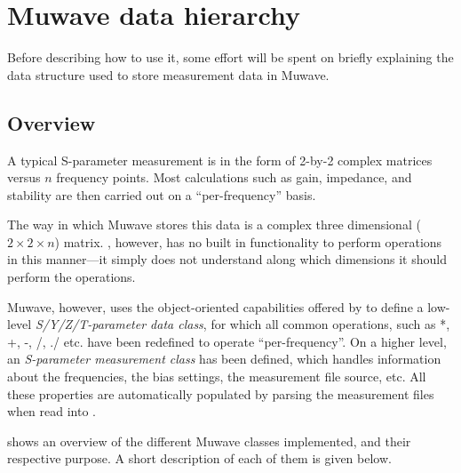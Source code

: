 %

\section{Muwave data hierarchy} %
Before describing how to use it, some effort will be spent on
briefly explaining the data structure used to store measurement
data in Muwave.

\subsection{Overview}
A typical S-parameter measurement is in the form of 2-by-2 complex
matrices versus $n$ frequency points. Most calculations such as
gain, impedance, and stability are then carried out on a
``per-frequency'' basis.

The way in which Muwave stores this data is a complex three
dimensional ($2 \times 2\times n$) matrix. \matlab, however, has
no built in functionality to perform operations in this
manner---it simply does not understand along which dimensions it
should perform the operations.

Muwave, however, uses the object-oriented capabilities offered by
\matlab to define a low-level \emph{S/Y/Z/T-parameter data class},
for which all common \matlab operations, such as *, +, -, /, ./
etc. have been redefined to operate ``per-frequency''. On a higher
level, an \emph{S-parameter measurement class} has been defined,
which handles information about the frequencies, the bias
settings, the measurement file source, etc. All these properties
are automatically populated by parsing the measurement files when
read into \matlab.

 shows an overview of the different Muwave
classes implemented, and their respective purpose. A short
description of each of them is given below.

